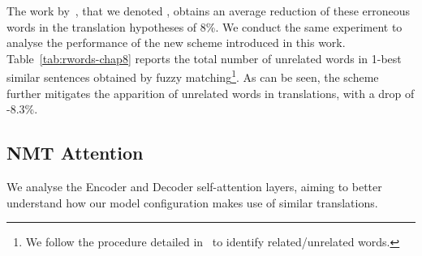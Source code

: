 The work by~\citet{xu20boosting}, that we denoted , obtains an average reduction of these erroneous words in the translation hypotheses of 8\%. We conduct the same experiment to analyse the performance of the new scheme  introduced in this work.
%
Table~\ref{tab:rwords-chap8} reports the total number of unrelated words in 1-best similar sentences obtained by fuzzy matching\footnote{We follow the procedure detailed in~\citet{xu20boosting} to identify related/unrelated words.}. As can be seen, the scheme  further mitigates the apparition of unrelated words in translations, with a drop of -8.3\%.

\begin{table}[h!]
\begin{center}

\end{center}
  \caption{Number of unrelated words appearing in test sets according to different augmentation schemes. The last row indicates the total number of unrelated words included in 1-best  similar sentences.}
  \label{tab:rwords-chap8}
\end{table}

\subsection*{NMT Attention}

We analyse the Encoder and Decoder self-attention layers, aiming to better understand how our  model configuration makes use of similar translations.

